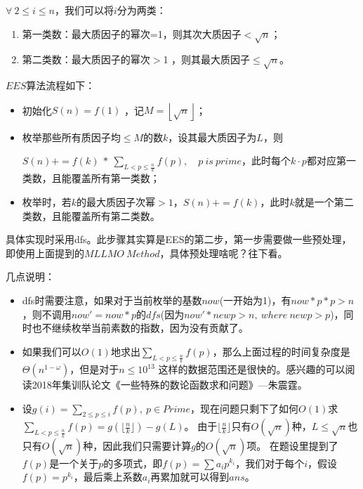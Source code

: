 \begin{solution}
$\forall  \ 2\le i\le n$，我们可以将$i$分为两类：
\begin{enumerate}
	\item 第一类数：最大质因子的幂次=1，则其次大质因子$< \sqrt{n}$；
	\item 第二类数：最大质因子的幂次$>$1 ，则其最大质因子$\le \sqrt{n}$。
\end{enumerate}

\vbox{}

{\heiti $EES$算法流程如下：}
\begin{itemize}
	\item 初始化$S(n)=f(1)$ ，记$M=\left\lfloor \sqrt{n} \right\rfloor$；
	\item 枚举那些所有质因子均$\le M$的数$k$，设其最大质因子为$L$，则
	
	$S(n)+=f(k)\ *\ \sum_{L<p\le \frac n k}f(p), \quad p \ is \ prime $，此时每个$k\cdot p$都对应第一类数，且能覆盖所有第一类数；
	\item 枚举时，若$k$的最大质因子次幂$>1$，$S(n)+=f(k)$，此时$k$就是一个第二类数，且能覆盖所有第二类数。
\end{itemize}
\begin{note}
	具体实现时采用dfs。此步骤其实算是EES的第二步，第一步需要做一些预处理，即使用上面提到的$MLLMO\ Method$，具体预处理啥呢？往下看。
\end{note}

\vbox{}

{\heiti 几点说明：}
\begin{itemize}
	\item dfs时需要注意，如果对于当前枚举的基数$now$(一开始为1)，有$now*p*p>n$，则不调用$now' = now*p$的$dfs$(\quad 因为$now' * newp > n,\ where\ newp>p$\quad )，同时也不继续枚举当前素数的指数，因为没有贡献了。
	\item 如果我们可以$O(1)$地求出$\sum_{L<p\le \frac n k}f(p)$，那么上面过程的时间复杂度是$\Theta(n^{1-\omega})$，但是对于$n \leq 10^{13}$
	这样的数据范围还是很快的。感兴趣的可以阅读2018年集训队论文《一些特殊的数论函数求和问题》---朱震霆。
	\item 设$g(i)=\sum_{2\le p\le i}f(p),\ p\in Prime$，现在问题只剩下了如何$O(1)$求$\sum_{L<p\le \frac n k}f(p)=g(\lfloor \frac n k\rfloor)-g(L)$。
	由于$\lfloor \frac n k\rfloor$只有$O(\sqrt{n})$种，$L\le \sqrt{n}$也只有$O(\sqrt{n})$种，因此我们只需要计算$g$的$O(\sqrt{n})$项。
	在题设里提到了$f(p)$是一个关于$p$的多项式，即$f(p)=\sum a_ip^{k_i}$，我们对于每个$i$，假设$f(p)=p^{k_i}$，最后乘上系数$a_i$再累加就可以得到$ans$。
	

\end{itemize}
\end{solution}
